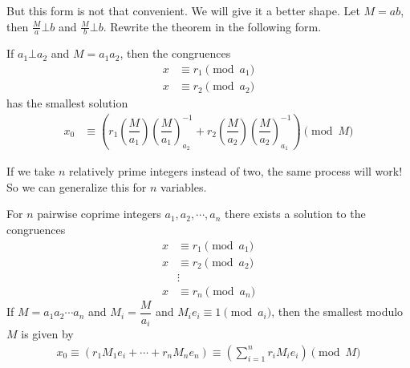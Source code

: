 \documentclass{subfile}
\begin{document}
	But this form is not that convenient. We will give it a better shape. Let $M=ab$, then $\frac{M}{a}\bot b$ and $\frac{M}{b}\bot b$. Rewrite the theorem in the following form.
		\begin{theorem}
			If $a_1\bot a_2$ and $M=a_1a_2$, then the congruences
			\begin{align*}
			x & \equiv r_1\pmod{a_1}\\
			x & \equiv r_2\pmod{a_2}
			\end{align*}
			has the smallest solution
			\begin{align*}
			x_0 & \equiv
			\left(r_1\left(\dfrac{M}{a_1}\right)\left(\dfrac{M}{a_1}\right)^{-1}_{a_2}+r_2\left(\dfrac{M}{a_2}\right)\left(\dfrac{M}{a_2}\right)^{-1}_{a_1}\right)\pmod{M}
			\end{align*}
		\end{theorem}
	If we take $n$ relatively prime integers instead of two, the same process will work! So we can generalize this for $n$ variables.
		\begin{theorem}[CRT]
			For $n$ pairwise coprime integers $a_1,a_2,\cdots,a_n$ there exists a solution to the congruences
				\begin{align*}
					x & \equiv r_1\pmod{a_1}\\
					x & \equiv r_2\pmod{a_2}\\
					   &\vdots\\
					x & \equiv r_n\pmod{a_n}
				\end{align*}
			If $M=a_1a_2\cdots a_n$ and $M_i=\dfrac{M}{a_i}$ and $M_ie_i\equiv1\pmod{a_i}$, then the smallest  modulo $M$ is given by
			\begin{align*}
			x_0  \equiv \left(r_1 M_1e_i+\cdots+r_n M_ne_n\right)\equiv \left(\sum_{i=1}^{n} r_i M_ie_i\right)\pmod M
			\end{align*}
		\end{theorem}
\end{document}
